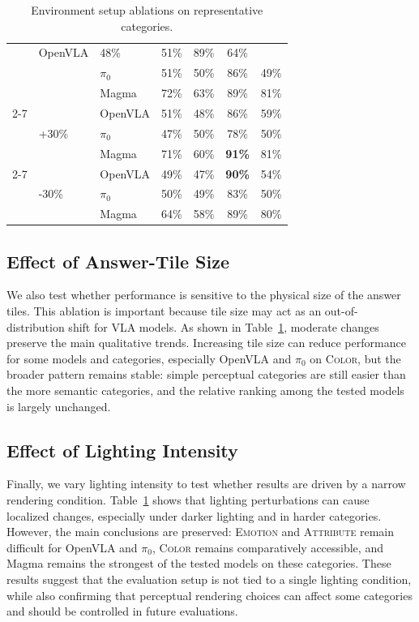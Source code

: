\documentclass{llmxive}
\providecommand{\heatDG}[1]{\cellcolor{mydarkgreen}\textbf{#1}}
\providecommand{\heatG}[1]{\cellcolor{mygreen}#1}
\providecommand{\heatLG}[1]{\cellcolor{mylightgreen}#1}
\providecommand{\heatO}[1]{\cellcolor{myorange}#1}
\begin{document}
\begin{table}[t]
{\begin{tabular}{lllcccc}
& OpenVLA & \heatO{48\%} & \heatO{51\%} & \heatG{89\%} & \heatG{64\%} \\
& & $\pi_0$ & \heatO{51\%} & \heatO{50\%} & \heatG{86\%} & \heatO{49\%} \\
& & Magma & \heatG{72\%} & \heatG{63\%} & \heatG{89\%} & \heatG{81\%} \\
\cmidrule(lr){2-7}
& \multirow{3}{*}{+30\%}
& OpenVLA & \heatO{51\%} & \heatO{48\%} & \heatG{86\%} & \heatLG{59\%} \\
& & $\pi_0$ & \heatO{47\%} & \heatO{50\%} & \heatG{78\%} & \heatO{50\%} \\
& & Magma & \heatG{71\%} & \heatG{60\%} & \heatDG{91\%} & \heatG{81\%} \\
\cmidrule(lr){2-7}
& \multirow{3}{*}{-30\%}
& OpenVLA & \heatO{49\%} & \heatO{47\%} & \heatDG{90\%} & \heatLG{54\%} \\
& & $\pi_0$ & \heatO{50\%} & \heatO{49\%} & \heatG{83\%} & \heatO{50\%} \\
& & Magma & \heatG{64\%} & \heatLG{58\%} & \heatG{89\%} & \heatG{80\%} \\
\bottomrule
\end{tabular}
}
\caption{Environment setup ablations on representative categories.}
\label{tab:appendix_environment_setup_ablations}
\end{table}

\subsection{Effect of Answer-Tile Size}

We also test whether performance is sensitive to the physical size of the answer tiles.
This ablation is important because tile size may act as an out-of-distribution shift for VLA models.
As shown in Table~\ref{tab:appendix_environment_setup_ablations}, moderate changes preserve the main qualitative trends.
Increasing tile size can reduce performance for some models and categories, especially OpenVLA and $\pi_0$ on \textsc{Color}, but the broader pattern remains stable: simple perceptual categories are still easier than the more semantic categories, and the relative ranking among the tested models is largely unchanged.

\subsection{Effect of Lighting Intensity}

Finally, we vary lighting intensity to test whether results are driven by a narrow rendering condition.
Table~\ref{tab:appendix_environment_setup_ablations} shows that lighting perturbations can cause localized changes, especially under darker lighting and in harder categories.
However, the main conclusions are preserved: \textsc{Emotion} and \textsc{Attribute} remain difficult for OpenVLA and $\pi_0$, \textsc{Color} remains comparatively accessible, and Magma remains the strongest of the tested models on these categories.
These results suggest that the evaluation setup is not tied to a single lighting condition, while also confirming that perceptual rendering choices can affect some categories and should be controlled in future evaluations.
\end{document}
